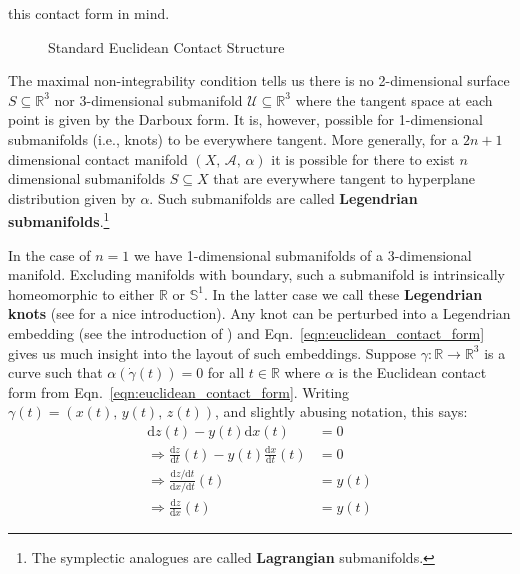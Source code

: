     this contact form in mind.
    \begin{figure}
        \centering
        \caption{Standard Euclidean Contact Structure}
        \label{fig:darboux_form_001}
    \end{figure}
    \par\hfill\par
    The maximal non-integrability condition tells us there is no 2-dimensional
    surface $S\subseteq\mathbb{R}^{3}$ nor 3-dimensional submanifold
    $\mathcal{U}\subseteq\mathbb{R}^{3}$ where the tangent space at each point
    is given by the Darboux form. It is, however, possible for 1-dimensional
    submanifolds (i.e., knots) to be everywhere tangent. More generally, for
    a $2n+1$ dimensional contact manifold $(X,\,\mathcal{A},\,\alpha)$ it is
    possible for there to exist $n$ dimensional submanifolds
    $S\subseteq{X}$ that are everywhere tangent to hyperplane distribution
    given by $\alpha$. Such submanifolds
    are called \textbf{Legendrian submanifolds}.\footnote{%
        The symplectic analogues are called \textbf{Lagrangian} submanifolds.
    }
    \par\hfill\par
    In the case of $n=1$ we have 1-dimensional submanifolds of a 3-dimensional
    manifold. Excluding manifolds with boundary, such a submanifold is
    intrinsically homeomorphic to either $\mathbb{R}$ or $\mathbb{S}^{1}$.
    In the latter case we call these \textbf{Legendrian knots}
    (see \cite{JoshuaMSabloffWhatIsLegendrianKnot} for a nice introduction).
    Any knot can be perturbed into a Legendrian embedding
    (see the introduction of \cite{VeraVertessiTransNonSimpleKnots}) and
    Eqn.~\ref{eqn:euclidean_contact_form} gives us much insight into the
    layout of such embeddings. Suppose
    $\gamma:\mathbb{R}\rightarrow\mathbb{R}^{3}$ is a curve such that
    $\alpha(\dot{\gamma}(t))=0$ for all $t\in\mathbb{R}$ where $\alpha$
    is the Euclidean contact form from Eqn.~\ref{eqn:euclidean_contact_form}.
    Writing $\gamma(t)=(x(t),\,y(t),\,z(t))$, and slightly abusing notation,
    this says:
    \begin{subequations}
        \label{eqn:euclidean_legendrian_knot_relations}
        \begin{align}
            \textrm{d}z(t)-y(t)\textrm{d}x(t)
            &=0\\
            \Rightarrow
            \frac{\textrm{d}z}{\textrm{d}t}(t)-
            y(t)\frac{\textrm{d}x}{\textrm{d}t}(t)
            &=0\\
            \Rightarrow
            \frac{\textrm{d}z/\textrm{d}t}{\textrm{d}x/\textrm{d}t}(t)
            &=y(t)\\
            \Rightarrow
            \frac{\textrm{d}z}{\textrm{d}x}(t)
            &=y(t)
        \end{align}
    \end{subequations}
